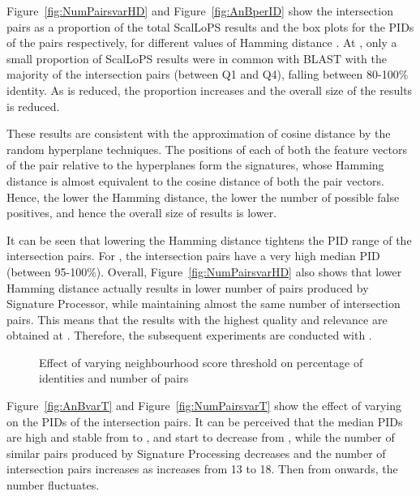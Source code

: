 \documentclass[titlepage]{csetr}
\begin{document}
Figure~\ref{fig:NumPairsvarHD} and Figure~\ref{fig:AnBperID} show the intersection pairs as a proportion of the total ScalLoPS results and the box plots for the PIDs of the pairs respectively, for different values of Hamming distance . At , only a small proportion of ScalLoPS results were in common with BLAST with the majority of the intersection pairs (between Q1 and Q4), falling between 80-100\% identity. As  is reduced, the proportion increases and the overall size of the results is reduced. 

These results are consistent with the approximation of cosine distance by the random hyperplane techniques. The positions of each of both the feature vectors of the pair relative to the hyperplanes form the signatures, whose Hamming distance is almost equivalent to the cosine distance of both the pair vectors. Hence, the lower the Hamming distance, the lower the number of possible false positives, and hence the overall size of results is lower. 

It can be seen that lowering the Hamming distance tightens the PID range of the intersection pairs. For , the intersection pairs have a very high median PID (between 95-100\%). Overall, Figure~\ref{fig:NumPairsvarHD} also shows that lower Hamming distance actually results in lower number of pairs produced by Signature Processor, while maintaining almost the same number of intersection pairs. This means that the results with the highest quality and relevance are obtained at . Therefore, the subsequent experiments are conducted with .
 



\begin{figure}[t]
\centering
{}
\caption{Effect of varying neighbourhood score threshold on percentage of identities and number of pairs}
\label{fig:exp-quality-varT}
\end{figure}

Figure~\ref{fig:AnBvarT} and Figure~\ref{fig:NumPairsvarT} show the effect of varying  on the PIDs of the intersection pairs. It can be perceived that the median PIDs are high and stable from  to , and start to decrease from , while the number of similar pairs produced by Signature Processing decreases and the number of intersection pairs increases as  increases from 13 to 18. Then from  onwards, the number fluctuates.
\end{document}
